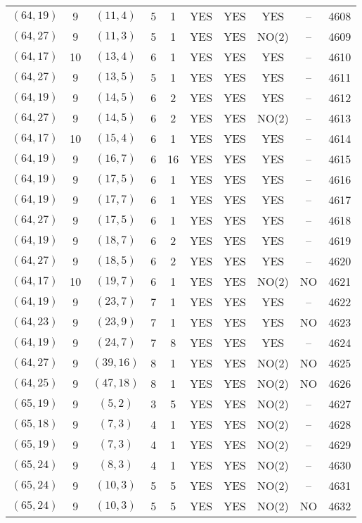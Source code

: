 \begin{longtable}{|c|c|c|c|c|c|c|c|c|c|}
$(64, 19)$ & 9 & $(11, 4)$ & 5 & 1 & YES & YES & YES & -- & 4608\\
$(64, 27)$ & 9 & $(11, 3)$ & 5 & 1 & YES & YES & NO(2) & -- & 4609\\
$(64, 17)$ & 10 & $(13, 4)$ & 6 & 1 & YES & YES & YES & -- & 4610\\
$(64, 27)$ & 9 & $(13, 5)$ & 5 & 1 & YES & YES & YES & -- & 4611\\
$(64, 19)$ & 9 & $(14, 5)$ & 6 & 2 & YES & YES & YES & -- & 4612\\
$(64, 27)$ & 9 & $(14, 5)$ & 6 & 2 & YES & YES & NO(2) & -- & 4613\\
$(64, 17)$ & 10 & $(15, 4)$ & 6 & 1 & YES & YES & YES & -- & 4614\\
$(64, 19)$ & 9 & $(16, 7)$ & 6 & 16 & YES & YES & YES & -- & 4615\\
$(64, 19)$ & 9 & $(17, 5)$ & 6 & 1 & YES & YES & YES & -- & 4616\\
$(64, 19)$ & 9 & $(17, 7)$ & 6 & 1 & YES & YES & YES & -- & 4617\\
$(64, 27)$ & 9 & $(17, 5)$ & 6 & 1 & YES & YES & YES & -- & 4618\\
$(64, 19)$ & 9 & $(18, 7)$ & 6 & 2 & YES & YES & YES & -- & 4619\\
$(64, 27)$ & 9 & $(18, 5)$ & 6 & 2 & YES & YES & YES & -- & 4620\\
$(64, 17)$ & 10 & $(19, 7)$ & 6 & 1 & YES & YES & NO(2) & NO & 4621\\
$(64, 19)$ & 9 & $(23, 7)$ & 7 & 1 & YES & YES & YES & -- & 4622\\
$(64, 23)$ & 9 & $(23, 9)$ & 7 & 1 & YES & YES & YES & NO & 4623\\
$(64, 19)$ & 9 & $(24, 7)$ & 7 & 8 & YES & YES & YES & -- & 4624\\
$(64, 27)$ & 9 & $(39, 16)$ & 8 & 1 & YES & YES & NO(2) & NO & 4625\\
$(64, 25)$ & 9 & $(47, 18)$ & 8 & 1 & YES & YES & NO(2) & NO & 4626\\
$(65, 19)$ & 9 & $(5, 2)$ & 3 & 5 & YES & YES & NO(2) & -- & 4627\\
$(65, 18)$ & 9 & $(7, 3)$ & 4 & 1 & YES & YES & NO(2) & -- & 4628\\
$(65, 19)$ & 9 & $(7, 3)$ & 4 & 1 & YES & YES & NO(2) & -- & 4629\\
$(65, 24)$ & 9 & $(8, 3)$ & 4 & 1 & YES & YES & NO(2) & -- & 4630\\
$(65, 24)$ & 9 & $(10, 3)$ & 5 & 5 & YES & YES & NO(2) & -- & 4631\\
$(65, 24)$ & 9 & $(10, 3)$ & 5 & 5 & YES & YES & NO(2) & NO & 4632\\

\end{longtable}
